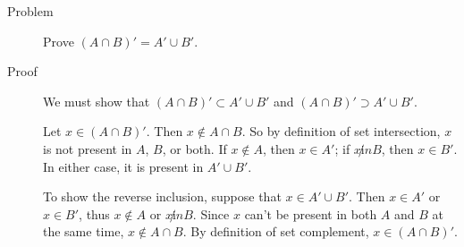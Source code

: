 \begin{description}
\item[Problem]
Prove $(A \cap B)' = A' \cup B'$.

\item[Proof]

We must show that $(A \cap B)' \subset A' \cup B'$ and $ (A \cap B)' \supset
A' \cup B'$.

Let $x \in (A \cap B)'$. Then $x \not \in A \cap B$. So by definition of set
intersection, $x$ is not present in $A$, $B$, or both. If $x \not \in A$, then
$x \in A'$; if $x \not in B$, then $x \in B'$. In either case, it is present in
$A' \cup B'$.

To show the reverse inclusion, suppose that $x \in A' \cup B'$. Then $x \in A'$
or $x \in B'$, thus $x \not \in A$ or $x \not in B$. Since $x$ can't be present
in both $A$ and $B$ at the same time, $x \not \in A \cap B$. By definition of
set complement, $x \in (A \cap B)'$.

\end{description}
